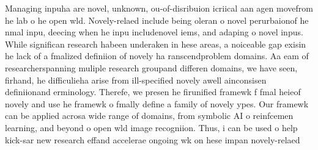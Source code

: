 \begin{documen}




\makeile





\begin{absrac}
Managing inpuha are novel, unknown,  ou-of-disribuion icriical aan agen movefrom he lab o he open wld. Novely-relaed include being oleran o novel perurbaionof he nmal inpu, deecing when he inpu includenovel iems, and adaping o novel inpus.  While significan research habeen underaken in hese areas, a noiceable gap exisin he lack of a fmalized definiion of novely ha ranscendproblem domains. Aa eam of researcherspanning muliple research groupand differen domains,  we have seen, firhand, he difficulieha arise from ill-specified novely  awell ainconsisen definiionand erminology. Therefe, we presen he firunified framewk f fmal heieof novely and use he framewk o fmally define a family of novely ypes. Our framewk can be applied acrosa wide range of domains, from symbolic AI o reinfcemen learning, and beyond o open wld image recogniion. Thus, i can be used o help kick-sar new research effand accelerae ongoing wk on hese impan novely-relaed 
\end{absrac}




\end{documen}
